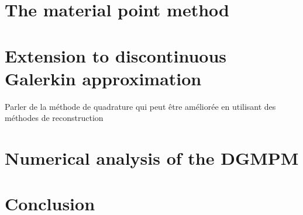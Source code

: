 \section{The material point method}
\label{sec:MPM}


\section{Extension to discontinuous Galerkin approximation}
\label{sec:DGMPM}

Parler de la méthode de quadrature qui peut être améliorée en utilisant des méthodes de  reconstruction \cite{BsplineMPM}\cite{MPM_BSpline1}

% 

\section{Numerical analysis of the DGMPM}
\label{sec:DGMPM_analysis}



\section*{Conclusion}

